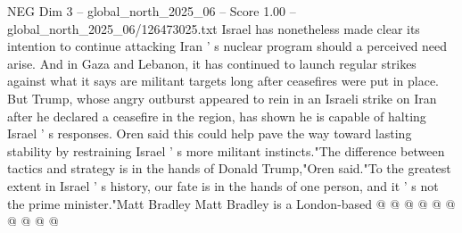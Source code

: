 \begin{textsample}{NEG Dim 3 – global\_north\_2025\_06 – Score 1.00 – global\_north\_2025\_06/126473025.txt}
Israel has nonetheless made clear its intention to continue attacking Iran ' s nuclear program should a perceived need arise.
And in Gaza and Lebanon, it has continued to launch regular strikes against what it says are militant targets long after ceasefires were put in place.
But Trump, whose angry outburst appeared to rein in an Israeli strike on Iran after he declared a ceasefire in the region, has shown he is capable of halting Israel ' s responses.
Oren said this could help pave the way toward lasting stability by restraining Israel ' s more militant instincts."The difference between tactics and strategy is in the hands of Donald Trump,"Oren said."To the greatest extent in Israel ' s history, our fate is in the hands of one person, and it ' s not the prime minister."Matt Bradley Matt Bradley is a London-based @ @ @ @ @ @ @ @ @ @

\end{textsample}
